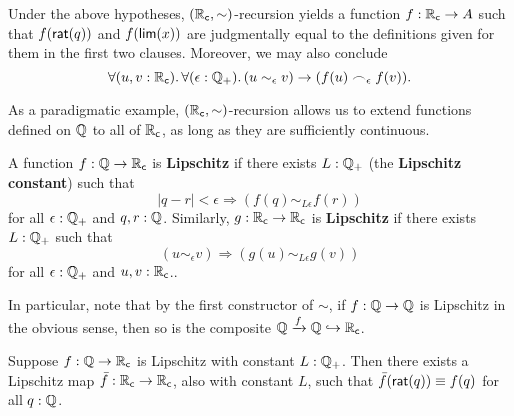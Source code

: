 Under the above hypotheses, $(\mathbb{R}_\mathsf{c},\sim)$-recursion yields a function $f:\mathbb{R}_\mathsf{c}\to A$ such that $f(\mathsf{rat}(q))$ and $f(\mathsf{lim}(x))$ are judgmentally equal to the definitions given for them in the first two clauses.
Moreover, we may also conclude
\begin{equation}
  \fall{u,v:\RC}{\epsilon:\Qp} (u\sim_\epsilon v) \to (f(u) \bsim_\epsilon f(v)).\label{eq:RC-sim-recursion-extra}
\end{equation}

As a paradigmatic example, $(\mathbb{R}_\mathsf{c},\sim)$-recursion allows us to extend functions defined on $\mathbb{Q}$ to all of $\mathbb{R}_\mathsf{c}$, as long as they are sufficiently continuous.

\begin{defn}\label{defn:lipschitz}
  A function $f:\mathbb{Q}\to\mathbb{R}_\mathsf{c}$ is \textbf{Lipschitz} if there exists $L:\mathbb{Q}_{+}$ (the \textbf{Lipschitz constant}) such that
  \[ |q - r|<\epsilon \Rightarrow (f(q) \sim_{L\epsilon} f(r)) \]
  for all $\epsilon:\mathbb{Q}_{+}$ and $q,r:\mathbb{Q}$.
  Similarly, $g:\mathbb{R}_\mathsf{c}\to\mathbb{R}_\mathsf{c}$ is \textbf{Lipschitz} if there exists $L:\mathbb{Q}_{+}$ such that
  \[ (u\sim_\epsilon v) \Rightarrow (g(u) \sim_{L\epsilon} g(v)) \]
  for all $\epsilon:\mathbb{Q}_{+}$ and $u,v:\mathbb{R}_\mathsf{c}$..
\end{defn}

In particular, note that by the first constructor of $\sim$, if $f:\mathbb{Q}\to\mathbb{Q}$ is Lipschitz in the obvious sense, then so is the composite $\mathbb{Q}\xrightarrow{f} \mathbb{Q} \hookrightarrow \mathbb{R}_\mathsf{c}$.

\begin{lem}\label{RC-extend-Q-Lipschitz}
  Suppose $f : \mathbb{Q} \to \mathbb{R}_\mathsf{c}$ is Lipschitz with constant $L : \mathbb{Q}_{+}$.
  Then there exists a Lipschitz map $\bar{f} : \mathbb{R}_\mathsf{c} \to \mathbb{R}_\mathsf{c}$, also with constant $L$, such that $\bar{f}(\mathsf{rat}(q)) \equiv f(q)$ for all $q:\mathbb{Q}$.
\end{lem}

